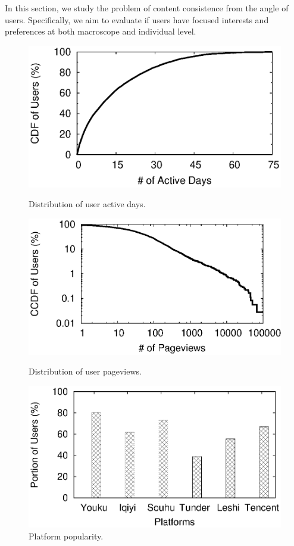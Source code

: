In this section, we study the problem of content consistence from the
angle of users. Specifically, we aim to evaluate if users have focused
interests and preferences at both macroscope and individual level. 
\begin{figure}[t]
\begin{minipage}{0.32\textwidth}
 \centering
	\includegraphics[width=1\textwidth]{plots/basic/cdf_user_active_days.eps}
	\caption{Distribution of user active days.}
	\label{fig:cdf_active_user}
\end{minipage}
\hfill
\begin{minipage}{0.32\textwidth}
 \centering
	\includegraphics[width=1\textwidth]{plots/basic/ccdf_user_pageviews.eps}
	\caption{Distribution of user pageviews.}
	\label{fig:ccdf_user_pv}
\end{minipage}
\hfill
\begin{minipage}{0.32\textwidth}
 \centering
	\includegraphics[width=1\textwidth]{plots/users/hist_platform_user.eps}
	\caption{Platform popularity.}
	\label{fig:hist_platform_user}
\end{minipage}
\end{figure}

